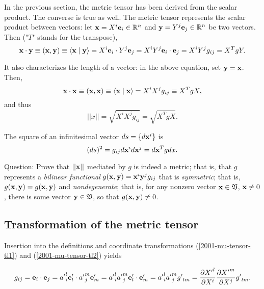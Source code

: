 In the previous section, the metric tensor has been derived from the scalar product.
The converse is true as well.
The metric tensor represents the scalar product between vectors: let
${\bf x}=X^i{\bf e}_i \in {\Bbb R}^n$ and ${\bf y}=Y^j{\bf e}_j \in {\Bbb R}^n$ be two vectors.
Then ("$T$" stands for the transpose),
\begin{equation}
{\bf x}\cdot {\bf y}\equiv ({\bf x},{\bf y})\equiv \langle {\bf x}\mid {\bf y}\rangle
= X^i {\bf e}_i\cdot Y^j {\bf e}_j
= X^iY^j {\bf e}_i\cdot  {\bf e}_j
=X^iY^j g_{ij}= X^T g Y.
\end{equation}

It also characterizes the length of a vector: in the above
equation, set ${\bf y}={\bf x}$. Then,
\begin{equation}
{\bf x}\cdot {\bf x}\equiv ({\bf x},{\bf x})\equiv \langle {\bf x}\mid {\bf x}\rangle
=X^iX^j g_{ij}\equiv X^T g X,
\end{equation}
and thus
\begin{equation}
\vert\vert  x\vert\vert  =\sqrt{X^iX^j g_{ij}}= \sqrt{X^T g X}.
\end{equation}


The square of an infinitesimal vector $ds =\{d{\bf x}^i\}$ is
\begin{equation}
(d s)^2  = g_{ij}d{\bf x}^id{\bf x}^j= d{\bf x}^T g dx.
\end{equation}


Question: Prove that $\vert\vert  {\bf x}\vert\vert $ mediated by $g$ is
indeed a metric; that is, that
$g$ represents a {\em bilinear functional}
$g({\bf x},{\bf y}) ={\bf x}^i{\bf y}^j g_{ij}$ that is {\em symmetric}; that is,
$g({\bf x},{\bf y}) = g({\bf x},{\bf y})$
and {\em nondegenerate}; that is, for any nonzero vector ${\bf x}\in {\frak V}$,   ${\bf x}\neq 0$,
there is some  vector  ${\bf y}\in {\frak V}$, so that  $g({\bf x},{\bf y}) \neq 0$.

\subsection{Transformation of the metric tensor}

Insertion into the definitions and coordinate transformations
(\ref{2001-mu-tensor-tl1})
and
(\ref{2001-mu-tensor-tl2})
yields

\begin{equation}
g_{ij}={\bf e}_i\cdot {\bf e}_j
={a'}^l_i{\bf e}'_l\cdot {a'}^m_j{\bf e}'_m
={a'}^l_i {a'}^m_j {\bf e}'_l\cdot {\bf e}'_m
= {a'}^l_i {a'}^m_j {g'}_{lm}
= {\partial {X'}^l\over \partial X^i}{\partial {X'}^m\over \partial X^j} {g'}_{lm}
.
\label{2011-m-emtdc}
\end{equation}

